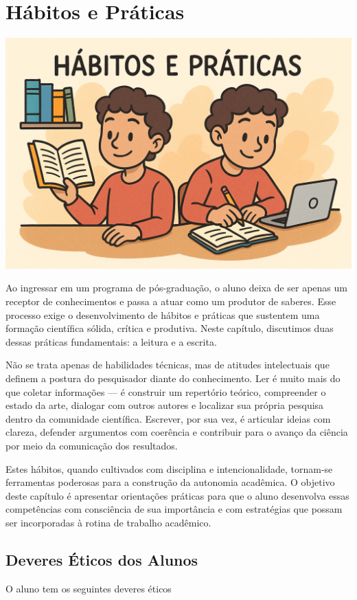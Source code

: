\chapter{Hábitos e Práticas}

\begin{center}
\includegraphics[width=0.5\linewidth]{Images/habitos.png}    
\end{center}
\vspace{0.5cm}

Ao ingressar em um programa de pós-graduação, o aluno deixa de ser apenas um receptor de conhecimentos e passa a atuar como um produtor de saberes. Esse processo exige o desenvolvimento de hábitos e práticas que sustentem uma formação científica sólida, crítica e produtiva. Neste capítulo, discutimos duas dessas práticas fundamentais: a leitura e a escrita.

Não se trata apenas de habilidades técnicas, mas de atitudes intelectuais que definem a postura do pesquisador diante do conhecimento. Ler é muito mais do que coletar informações — é construir um repertório teórico, compreender o estado da arte, dialogar com outros autores e localizar sua própria pesquisa dentro da comunidade científica. Escrever, por sua vez, é articular ideias com clareza, defender argumentos com coerência e contribuir para o avanço da ciência por meio da comunicação dos resultados.

Estes hábitos, quando cultivados com disciplina e intencionalidade, tornam-se ferramentas poderosas para a construção da autonomia acadêmica. O objetivo deste capítulo é apresentar orientações práticas para que o aluno desenvolva essas competências com consciência de sua importância e com estratégias que possam ser incorporadas à rotina de trabalho acadêmico.

\section{Deveres Éticos dos Alunos}

O aluno tem os seguintes deveres éticos

